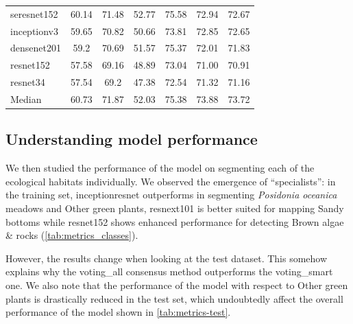 \begin{table}[H]
{\begin{tabular}{lcccccc}
            seresnet152             & 60.14          & 71.48          & 52.77
                                    & 75.58          & 72.94          & 72.67
            \\
            inceptionv3             & 59.65          & 70.82          & 50.66
                                    & 73.81          & 72.85          & 72.65
            \\
            densenet201             & 59.2           & 70.69          & 51.57
                                    & 75.37          & 72.01          & 71.83
            \\
            resnet152               & 57.58          & 69.16          & 48.89
                                    & 73.04          & 71.00          &
            70.91
            \\
            resnet34                & 57.54          & 69.2           & 47.38
                                    & 72.54          & 71.32          & 71.16
            \\
            \hdashline
            Median                  & 60.73          & 71.87          & 52.03
                                    & 75.38          & 73.88          & 73.72
            \\
            \bottomrule
        \end{tabular}
    }
\end{table}

\subsection{Understanding model performance}

We then studied the performance of the model on segmenting each of the
ecological habitats individually. We observed the emergence of ``specialists'':
in the training set, inceptionresnet outperforms in segmenting
\textit{Posidonia oceanica} meadows and Other green plants, resnext101 is
better suited for mapping Sandy bottoms while resnet152 shows enhanced
performance for detecting Brown algae \& rocks (\cref{tab:metrics_classes}).

However, the results change when looking at the test dataset. This somehow
explains why the voting\_all consensus method outperforms the voting\_smart
one. We also note that the performance of the model with respect to Other green
plants is drastically reduced in the test set, which undoubtedly affect the
overall performance of the model shown in \cref{tab:metrics-test}.

